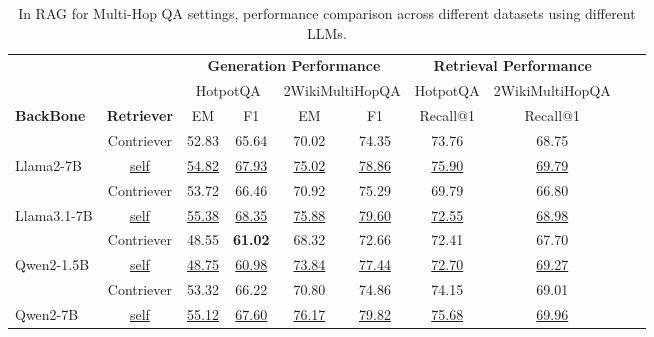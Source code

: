 \documentclass{article}
\begin{document}
\renewcommand\arraystretch{1.1}
\begin{table}[htbp]
    \small
    \centering
    \setlength\aboverulesep{0pt}\setlength\belowrulesep{0pt}
    \begin{tabular*}{\textwidth}{@{\extracolsep{\fill}} ll|cccc|cccc}
    \toprule
    \multicolumn{1}{l}{} & \multicolumn{1}{l}{} & \multicolumn{4}{c}{\textbf{Generation Performance}} & \multicolumn{2}{c}{\textbf{Retrieval Performance}} \\  \cmidrule(lr){3-6} \cmidrule(lr){7-8} 
    \multicolumn{1}{l}{} & \multicolumn{1}{l}{} & \multicolumn{2}{c}{HotpotQA} & \multicolumn{2}{c}{2WikiMultiHopQA} & HotpotQA & 2WikiMultiHopQA \\  
    \cmidrule(lr){3-4} \cmidrule(lr){5-6} \cmidrule(lr){7-7} \cmidrule(lr){8-8}
    \textbf{BackBone} & \textbf{Retriever} & EM & F1 & EM & F1 & Recall@1 & Recall@1 \\  
    \midrule
    & \multicolumn{1}{c|}{Contriever} & 52.83 & 65.64 & 70.02 & \multicolumn{1}{c|}{74.35} & 73.76 & 68.75 \\
    \multirow{-2}{*}{Llama2-7B} & \multicolumn{1}{c|}{\underline{self}} & \underline{54.82} & \underline{67.93} & \underline{75.02} & \multicolumn{1}{c|}{\underline{78.86}} & \underline{75.90} & \underline{69.79} \\  \midrule
     & \multicolumn{1}{c|}{Contriever} & 53.72 & 66.46 & 70.92 & \multicolumn{1}{c|}{75.29} & 69.79 & 66.80 \\
    \multirow{-2}{*}{Llama3.1-7B} & \multicolumn{1}{c|}{\underline{self}} & \underline{55.38} & \underline{68.35} & \underline{75.88} & \multicolumn{1}{c|}{\underline{79.60}} & \underline{72.55} & \underline{68.98} \\  \midrule
     & \multicolumn{1}{c|}{Contriever} & 48.55 & \textbf{61.02} & 68.32 & \multicolumn{1}{c|}{72.66} & 72.41 & 67.70 \\
    \multirow{-2}{*}{Qwen2-1.5B} & \multicolumn{1}{c|}{\underline{self}} & \underline{48.75} & \underline{60.98} & \underline{73.84} & \multicolumn{1}{c|}{\underline{77.44}} & \underline{72.70} & \underline{69.27} \\  \midrule
     & \multicolumn{1}{c|}{Contriever} & 53.32 & 66.22 & 70.80 & \multicolumn{1}{c|}{74.86} & 74.15 & 69.01 \\
    \multirow{-2}{*}{Qwen2-7B} & \multicolumn{1}{c|}{\underline{self}} & \underline{55.12} & \underline{67.60} & \underline{76.17} & \multicolumn{1}{c|}{\underline{79.82}} & \underline{75.68} & \underline{69.96} \\ 
    \bottomrule
    \end{tabular*}
    \caption{In RAG for Multi-Hop QA settings, performance comparison across different datasets using different LLMs.}
    \label{tab:model-onepass}
\end{table}
\end{document}
